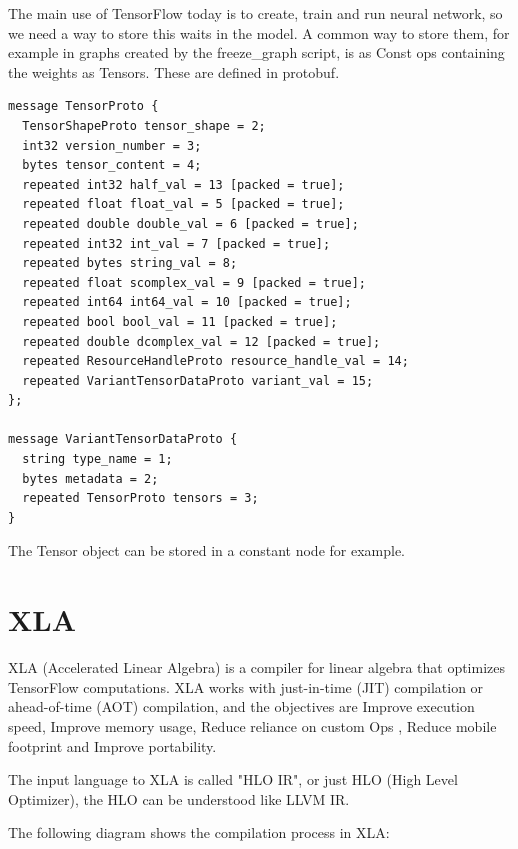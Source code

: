\documentclass[11pt,openany]{book}
\begin{document}
The main use of TensorFlow today is to create, train and run neural network, so we need a way to store this waits in the model. A common way to store them, for example in graphs created by the freeze\_graph script, is as Const ops containing the weights as Tensors. These are defined in protobuf.

\begin{verbatim}
message TensorProto {
  TensorShapeProto tensor_shape = 2;
  int32 version_number = 3;
  bytes tensor_content = 4;
  repeated int32 half_val = 13 [packed = true];
  repeated float float_val = 5 [packed = true];
  repeated double double_val = 6 [packed = true];
  repeated int32 int_val = 7 [packed = true];
  repeated bytes string_val = 8;
  repeated float scomplex_val = 9 [packed = true];
  repeated int64 int64_val = 10 [packed = true];
  repeated bool bool_val = 11 [packed = true];
  repeated double dcomplex_val = 12 [packed = true];
  repeated ResourceHandleProto resource_handle_val = 14;
  repeated VariantTensorDataProto variant_val = 15;
};

message VariantTensorDataProto {
  string type_name = 1;
  bytes metadata = 2;
  repeated TensorProto tensors = 3;
}
\end{verbatim}

The Tensor object can be stored in a constant node for example.

\chapter{XLA}

XLA (Accelerated Linear Algebra) is a compiler for linear algebra that optimizes TensorFlow computations. XLA works with just-in-time (JIT) compilation or ahead-of-time (AOT) compilation, and the objectives are Improve execution speed, Improve memory usage, Reduce reliance on custom Ops , Reduce mobile footprint and Improve portability.

The input language to XLA is called "HLO IR", or just HLO (High Level Optimizer), the HLO can be understood like LLVM IR.

The following diagram shows the compilation process in XLA:
\end{document}
